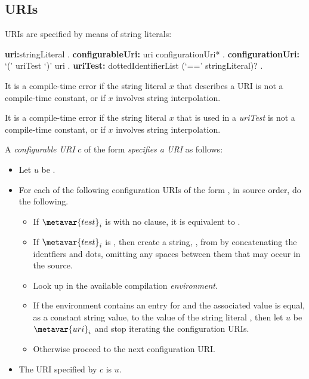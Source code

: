 \documentclass{article}
\begin{document}
\subsection{URIs}

\LMHash{}
URIs are specified by means of string literals:

\begin{grammar}
{\bf uri:}stringLiteral
  .
{\bf configurableUri:} uri configurationUri*
  .
{\bf configurationUri:} \IF{} `(' uriTest `)' uri
  .
{\bf uriTest:} dottedIdentifierList (`==' stringLiteral)?
  .
\end{grammar}

\LMHash{}
It is a compile-time error if the string literal $x$ that describes a URI is not a compile-time constant, or if $x$ involves string interpolation.

\LMHash{}
It is a compile-time error if the string literal $x$ that is used in a {\em uriTest} is not a compile-time constant, or if $x$ involves string interpolation.

\LMHash{} A {\em configurable URI} $c$ of the form  {\em specifies a URI} as follows:
\begin{itemize}
\item{} Let $u$ be .
\item{} For each of the following configuration URIs of the form , in source order, do the following.
\begin{itemize}
  \item{} If $\metavar{test}_i$ is  with no \code{==} clause, it is
  equivalent to .
  \item{} If $\metavar{test}_i$ is ,
  then create a string, , from 
  by concatenating the identfiers and dots,
  omitting any spaces between them that may occur in the source.
  \item{} Look up  in the available compilation {\em environment}.
  \item{} If the environment contains an entry for  and the
  associated value is equal, as a constant string value, to the value of
  the string literal ,
  then let $u$ be $\metavar{uri}_i$ and stop iterating the configuration URIs.
  \item{} Otherwise proceed to the next configuration URI.
\end{itemize}
\item{} The URI specified by $c$ is $u$.
\end{itemize}
\end{document}
